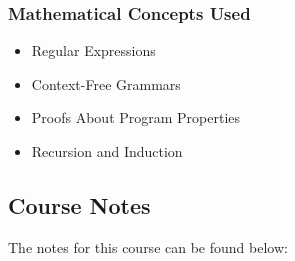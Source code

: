 {\begin{highlight}[\CSPBPPL]
        \subsubsection*{Mathematical Concepts Used}
        
        \begin{itemize}
            \item Regular Expressions
            \item Context-Free Grammars
            \item Proofs About Program Properties
            \item Recursion and Induction
        \end{itemize}
    \end{highlight}
}

\subsection{Course Notes}

The notes for this course can be found below:





